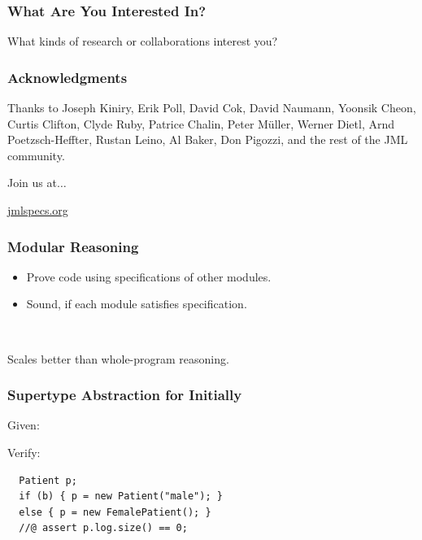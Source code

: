 \begin{frame}
\frametitle{What Are You Interested In?}

\begin{question}
What kinds of research or collaborations interest you?
\end{question}
\end{frame}


\begin{frame}
\frametitle{Acknowledgments}
Thanks to Joseph Kiniry, Erik Poll, David Cok, David Naumann, 
Yoonsik Cheon, Curtis Clifton, Clyde Ruby, Patrice Chalin,
Peter M\"{u}ller, Werner Dietl,
Arnd Poetzsch-Heffter,
Rustan Leino, 
Al Baker, Don Pigozzi,
and
the rest of the JML community.

Join us at$\ldots$

\begin{center}
\href{http://www.jmlspecs.org/}{jmlspecs.org}
\end{center}
\end{frame}


\appendix



\begin{frame}
\frametitle{Modular Reasoning}
\begin{itemize}
\item
Prove code using specifications of other modules.

\item
Sound, if each module satisfies specification.
\end{itemize}

~ 

Scales better than whole-program reasoning.
\end{frame}

\begin{frame}[fragile]
\frametitle{Supertype Abstraction for Initially}
Given:


Verify:
\begin{lstlisting}
  Patient p;
  if (b) { p = new Patient("male"); }
  else { p = new FemalePatient(); }
  //@ assert p.log.size() == 0;
\end{lstlisting}
\end{frame}


